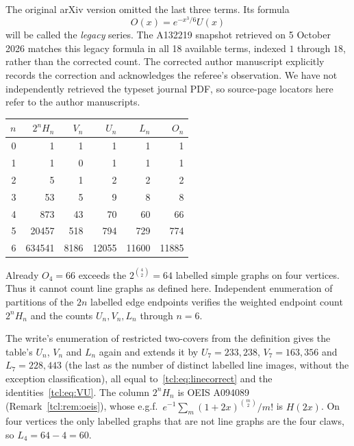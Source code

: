 The original arXiv version \cite[p.~6]{cpsv1} omitted the last three terms. Its formula
\[
O(x)=e^{-x^3/6}U(x)
\]
will be called the \emph{legacy} series. The A132219 snapshot retrieved on 5 October 2026 matches this legacy formula in all 18 available terms, indexed $1$ through $18$, rather than the corrected count. The corrected author manuscript explicitly records the correction and acknowledges the referee's observation. We have not independently retrieved the typeset journal PDF, so source-page locators here refer to the author manuscripts.

\begin{center}
\begin{tabular}{r r r r r r}
\toprule
$n$ & $2^nH_n$ & $V_n$ & $U_n$ & $L_n$ & $O_n$\\
\midrule
0&1&1&1&1&1\\
1&1&0&1&1&1\\
2&5&1&2&2&2\\
3&53&5&9&8&8\\
4&873&43&70&60&66\\
5&20457&518&794&729&774\\
6&634541&8186&12055&11600&11885\\
\bottomrule
\end{tabular}
\end{center}
Already $O_4=66$ exceeds the $2^{\binom42}=64$ labelled simple graphs on four vertices. Thus it cannot count line graphs as defined here. Independent enumeration of partitions of the $2n$ labelled edge endpoints verifies the weighted endpoint count $2^nH_n$ and the counts $U_n,V_n,L_n$ through $n=6$.
\begin{writenote}
The write's enumeration of restricted two-covers from the definition gives the
table's $U_n$, $V_n$ and $L_n$ again and extends it by $U_7=233{,}238$,
$V_7=163{,}356$ and $L_7=228{,}443$ (the last as the number of distinct
labelled line images, without the exception classification), all equal
to~\eqref{tcl:eq:linecorrect} and the identities~\eqref{tcl:eq:VU}. The
column $2^nH_n$ is OEIS A094089 (Remark~\ref{tcl:rem:oeis}), whose e.g.f.\
$e^{-1}\sum_m(1+2x)^{\binom m2}/m!$ is $H(2x)$. On four vertices the only
labelled graphs that are not line graphs are the four claws, so
$L_4=64-4=60$.
\end{writenote}

